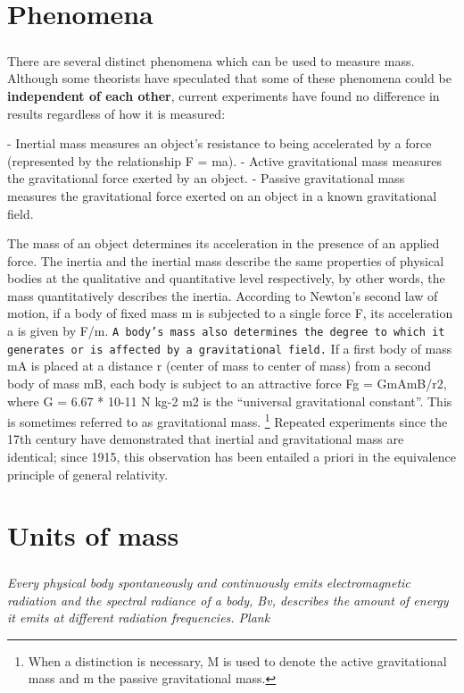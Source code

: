 \documentclass{book}
\begin{document}
	\tableofcontents
	
	\chapter{Phenomena}
	\setcounter{page}{1}
	\paragraph{}
	There are several distinct phenomena which can be used to measure mass. Although some theorists have speculated that some of these phenomena could be \textbf{independent of each other}, current experiments have found no difference in results regardless of how it is measured:
	
	- Inertial mass measures an object's resistance to being accelerated by a force (represented by the relationship F = ma).
	- Active gravitational mass measures the gravitational force exerted by an object.
	- Passive gravitational mass measures the gravitational force exerted on an object in a known gravitational field.
	
	
	The mass of an object determines its acceleration in the presence of an applied force. The inertia and the inertial mass describe the same properties of physical bodies at the qualitative and quantitative level respectively, by other words, the mass quantitatively describes the inertia. According to Newton's second law of motion, if a body of fixed mass m is subjected to a single force F, its acceleration a is given by F/m. \texttt{A body's mass also determines the degree to which it generates or is affected by a gravitational field.} If a first body of mass mA is placed at a distance r (center of mass to center of mass) from a second body of mass mB, each body is subject to an attractive force Fg = GmAmB/r2, where G = 6.67 * 10{-11} N kg{-2} m2 is the ``universal gravitational constant''. This is sometimes referred to as gravitational mass. \footnote{When a distinction is necessary, M is used to denote the active gravitational mass and m the passive gravitational mass.} Repeated experiments since the 17th century have demonstrated that inertial and gravitational mass are identical; since 1915, this observation has been entailed a priori in the equivalence principle of general relativity.
	
	\chapter{Units of mass}
	\paragraph{}
	\begin{flushright}
		\emph{Every physical body spontaneously and continuously emits electromagnetic radiation and the spectral radiance of a body, Bv, describes the amount of energy it emits at different radiation frequencies. \textemdash Plank}
	\end{flushright}
\end{document}
